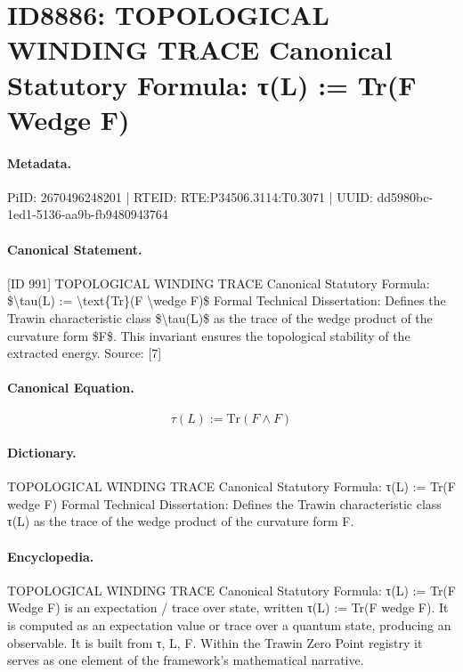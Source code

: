 \section*{ID8886: TOPOLOGICAL WINDING TRACE Canonical Statutory Formula: τ(L) := Tr(F Wedge F)}
\paragraph{Metadata.}
PiID: 2670496248201 | RTEID: RTE:P34506.3114:T0.3071 | UUID: dd5980bc-1ed1-5136-aa9b-fb9480943764

\paragraph{Canonical Statement.}
[ID 991] TOPOLOGICAL WINDING TRACE Canonical Statutory Formula: \$\textbackslash{}tau(L) := \textbackslash{}text\{Tr\}(F \textbackslash{}wedge F)\$ Formal Technical Dissertation: Defines the Trawin characteristic class \$\textbackslash{}tau(L)\$ as the trace of the wedge product of the curvature form \$F\$. This invariant ensures the topological stability of the extracted energy. Source: [7]

\paragraph{Canonical Equation.}
\[
\tau(L) := \text{Tr}(F \wedge F)
\]

\paragraph{Dictionary.}
TOPOLOGICAL WINDING TRACE Canonical Statutory Formula: τ(L) := Tr(F wedge F) Formal Technical Dissertation: Defines the Trawin characteristic class τ(L) as the trace of the wedge product of the curvature form F.

\paragraph{Encyclopedia.}
TOPOLOGICAL WINDING TRACE Canonical Statutory Formula: τ(L) := Tr(F Wedge F) is an expectation / trace over state, written τ(L) := Tr(F wedge F). It is computed as an expectation value or trace over a quantum state, producing an observable. It is built from τ, L, F. Within the Trawin Zero Point registry it serves as one element of the framework's mathematical narrative.
